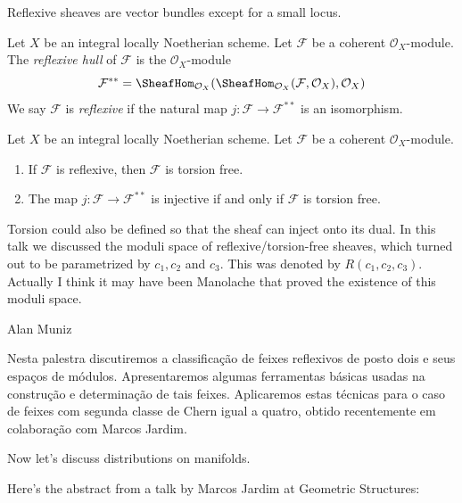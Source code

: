 \documentclass{book}
\begin{document}
\noindent
Reflexive sheaves
are vector bundles except for a small
locus.

\begin{definition}
\label{definition-reflexive}
Let $X$ be an integral locally Noetherian
scheme. Let $\mathcal{F}$
be a coherent $\mathcal{O}_X$-module.
The {\it reflexive hull}
of $\mathcal{F}$ is the
$\mathcal{O}_X$-module
$$
\mathcal{F}^{**} = \SheafHom_{\mathcal{O}_X}(
\SheafHom_{\mathcal{O}_X}(\mathcal{F},
\mathcal{O}_X), \mathcal{O}_X)
$$
We say $\mathcal{F}$ is {\it reflexive}
if the natural map
$j : \mathcal{F} \longrightarrow
\mathcal{F}^{**}$
is an isomorphism.
\end{definition}

\begin{lemma}
\label{lemma-reflexive-torsion-free}
Let $X$ be an integral locally Noetherian
scheme. Let $\mathcal{F}$
be a coherent $\mathcal{O}_X$-module.
\begin{enumerate}
\item If $\mathcal{F}$ is reflexive, then
$\mathcal{F}$
is torsion free.
\item The map $j : \mathcal{F}
\longrightarrow \mathcal{F}^{**}$
is injective if and only if $\mathcal{F}$
is torsion free.
\end{enumerate}
\end{lemma}

\begin{remark}
\label{remark-reflexive-talk}
Torsion could also be defined so that the
sheaf can inject onto its dual. In this talk
we discussed the moduli space of
reflexive/torsion-free sheaves, which turned
out to be parametrized by $c_1, c_2$ and
$c_3$. This was denoted by $R(c_1,c_2,c_3)$.
Actually I think it may have been Manolache
that proved the existence of this moduli
space.

Alan Muniz

Nesta palestra discutiremos a classificação
de feixes reflexivos de posto dois e seus
espaços de módulos. Apresentaremos algumas
ferramentas básicas usadas na construção e
determinação de tais feixes. Aplicaremos
estas técnicas para o caso de feixes com
segunda classe de Chern igual a quatro,
obtido recentemente em colaboração com Marcos
Jardim.
\end{remark}




\medskip\noindent
Now let's discuss
distributions on manifolds.

Here's the abstract from a talk by Marcos
Jardim at Geometric Structures:
\end{document}
